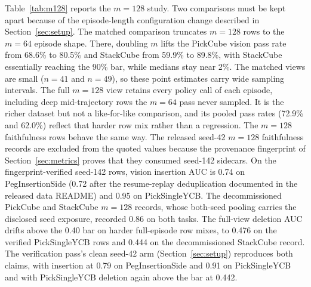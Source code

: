 \documentclass{article}
\begin{document}
Table~\ref{tab:m128} reports the $m{=}128$ study.
Two comparisons must be kept apart because of the episode-length configuration change described in Section~\ref{sec:setup}.
The matched comparison truncates $m{=}128$ rows to the $m{=}64$ episode shape.
There, doubling $m$ lifts the PickCube vision pass rate from 68.6\% to 80.5\% and StackCube from 59.9\% to 89.8\%, with StackCube essentially reaching the 90\% bar, while medians stay near 2\%.
The matched views are small ($n{=}41$ and $n{=}49$), so these point estimates carry wide sampling intervals.
The full $m{=}128$ view retains every policy call of each episode, including deep mid-trajectory rows the $m{=}64$ pass never sampled.
It is the richer dataset but not a like-for-like comparison, and its pooled pass rates (72.9\% and 62.0\%) reflect that harder row mix rather than a regression.
The $m{=}128$ faithfulness rows behave the same way.
The released seed-42 $m{=}128$ faithfulness records are excluded from the quoted values because the provenance fingerprint of Section~\ref{sec:metrics} proves that they consumed seed-142 sidecars.
On the fingerprint-verified seed-142 rows, vision insertion AUC is 0.74 on PegInsertionSide (0.72 after the resume-replay deduplication documented in the released data README) and 0.95 on PickSingleYCB.
The decommissioned PickCube and StackCube $m{=}128$ records, whose both-seed pooling carries the disclosed seed exposure, recorded 0.86 on both tasks.
The full-view deletion AUC drifts above the 0.40 bar on harder full-episode row mixes, to 0.476 on the verified PickSingleYCB rows and 0.444 on the decommissioned StackCube record.
The verification pass's clean seed-42 arm (Section~\ref{sec:setup}) reproduces both claims, with insertion at 0.79 on PegInsertionSide and 0.91 on PickSingleYCB and with PickSingleYCB deletion again above the bar at 0.442.
\end{document}
